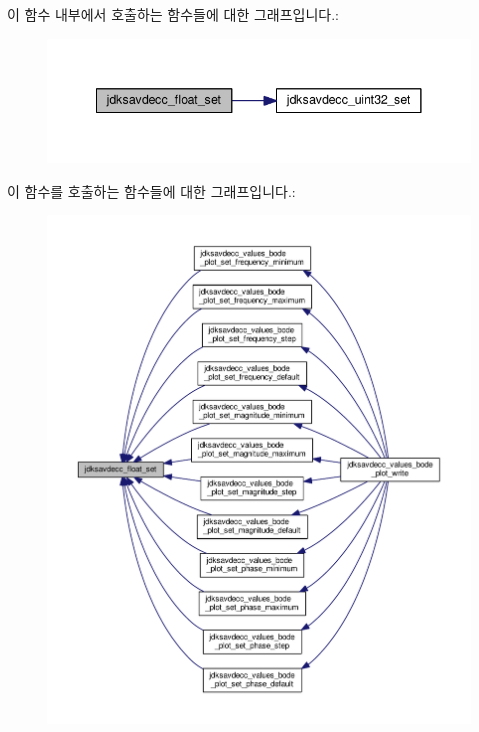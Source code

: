 이 함수 내부에서 호출하는 함수들에 대한 그래프입니다.\+:
\nopagebreak
\begin{figure}[H]
\begin{center}
\leavevmode
\includegraphics[width=341pt]{group__endian_ga1f92dcb7b9e5f21f1df4b563ee9e04d5_cgraph}
\end{center}
\end{figure}




이 함수를 호출하는 함수들에 대한 그래프입니다.\+:
\nopagebreak
\begin{figure}[H]
\begin{center}
\leavevmode
\includegraphics[width=350pt]{group__endian_ga1f92dcb7b9e5f21f1df4b563ee9e04d5_icgraph}
\end{center}
\end{figure}


